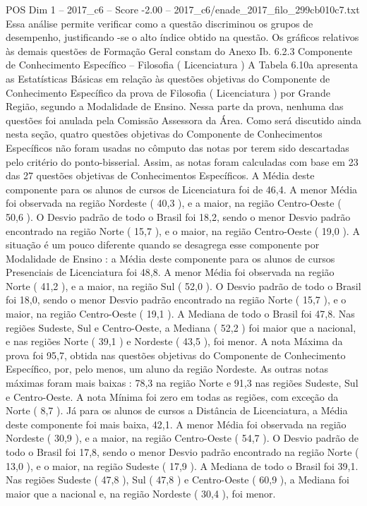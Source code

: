 \begin{textsample}{POS Dim 1 – 2017\_c6 – Score -2.00 – 2017\_c6/enade\_2017\_filo\_299cb010c7.txt}
Essa análise permite verificar como a questão discriminou os grupos de desempenho, justificando -se o alto índice obtido na questão.
Os gráficos relativos às demais questões de Formação Geral constam do Anexo Ib. 6.2.3 Componente de Conhecimento Específico – Filosofia ( Licenciatura ) A Tabela 6.10a apresenta as Estatísticas Básicas em relação às questões objetivas do Componente de Conhecimento Específico da prova de Filosofia ( Licenciatura ) por Grande Região, segundo a Modalidade de Ensino.
Nessa parte da prova, nenhuma das questões foi anulada pela Comissão Assessora da Área.
Como será discutido ainda nesta seção, quatro questões objetivas do Componente de Conhecimentos Específicos não foram usadas no cômputo das notas por terem sido descartadas pelo critério do ponto-bisserial.
Assim, as notas foram calculadas com base em 23 das 27 questões objetivas de Conhecimentos Específicos.
A Média deste componente para os alunos de cursos de Licenciatura foi de 46,4.
A menor Média foi observada na região Nordeste ( 40,3 ), e a maior, na região Centro-Oeste ( 50,6 ).
O Desvio padrão de todo o Brasil foi 18,2, sendo o menor Desvio padrão encontrado na região Norte ( 15,7 ), e o maior, na região Centro-Oeste ( 19,0 ).
A situação é um pouco diferente quando se desagrega esse componente por Modalidade de Ensino : a Média deste componente para os alunos de cursos Presenciais de Licenciatura foi 48,8.
A menor Média foi observada na região Norte ( 41,2 ), e a maior, na região Sul ( 52,0 ).
O Desvio padrão de todo o Brasil foi 18,0, sendo o menor Desvio padrão encontrado na região Norte ( 15,7 ), e o maior, na região Centro-Oeste ( 19,1 ).
A Mediana de todo o Brasil foi 47,8.
Nas regiões Sudeste, Sul e Centro-Oeste, a Mediana ( 52,2 ) foi maior que a nacional, e nas regiões Norte ( 39,1 ) e Nordeste ( 43,5 ), foi menor.
A nota Máxima da prova foi 95,7, obtida nas questões objetivas do Componente de Conhecimento Específico, por, pelo menos, um aluno da região Nordeste.
As outras notas máximas foram mais baixas : 78,3 na região Norte e 91,3 nas regiões Sudeste, Sul e Centro-Oeste.
A nota Mínima foi zero em todas as regiões, com exceção da Norte ( 8,7 ).
Já para os alunos de cursos a Distância de Licenciatura, a Média deste componente foi mais baixa, 42,1.
A menor Média foi observada na região Nordeste ( 30,9 ), e a maior, na região Centro-Oeste ( 54,7 ).
O Desvio padrão de todo o Brasil foi 17,8, sendo o menor Desvio padrão encontrado na região Norte ( 13,0 ), e o maior, na região Sudeste ( 17,9 ).
A Mediana de todo o Brasil foi 39,1.
Nas regiões Sudeste ( 47,8 ), Sul ( 47,8 ) e Centro-Oeste ( 60,9 ), a Mediana foi maior que a nacional e, na região Nordeste ( 30,4 ), foi menor.

\end{textsample}
